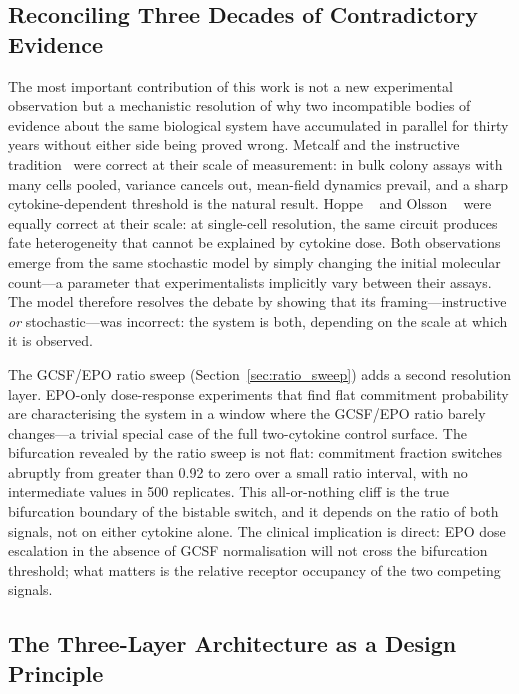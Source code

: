 
\subsection{Reconciling Three Decades of Contradictory Evidence}

The most important contribution of this work is not a new experimental
observation but a mechanistic resolution of why two incompatible bodies of
evidence about the same biological system have accumulated in parallel for thirty
years without either side being proved wrong. Metcalf and the instructive
tradition~\cite{metcalf1988} were correct at their scale of measurement: in bulk
colony assays with many cells pooled, variance cancels out, mean-field dynamics
prevail, and a sharp cytokine-dependent threshold is the natural result. Hoppe
\etal~\cite{hoppe2016} and Olsson \etal~\cite{olsson2016} were equally correct at
their scale: at single-cell resolution, the same circuit produces fate
heterogeneity that cannot be explained by cytokine dose. Both observations emerge
from the same stochastic model by simply changing the initial molecular
count---a parameter that experimentalists implicitly vary between their assays.
The model therefore resolves the debate by showing that its framing---instructive
\emph{or} stochastic---was incorrect: the system is both, depending on the scale
at which it is observed.

The GCSF/EPO ratio sweep (Section~\ref{sec:ratio_sweep}) adds a second resolution
layer. EPO-only dose-response experiments that find flat commitment probability
are characterising the system in a window where the GCSF/EPO ratio barely
changes---a trivial special case of the full two-cytokine control surface. The
bifurcation revealed by the ratio sweep is not flat: commitment fraction switches
abruptly from greater than 0.92 to zero over a small ratio interval, with no
intermediate values in 500 replicates. This all-or-nothing cliff is the true
bifurcation boundary of the bistable switch, and it depends on the ratio of both
signals, not on either cytokine alone. The clinical implication is direct: EPO
dose escalation in the absence of GCSF normalisation will not cross the
bifurcation threshold; what matters is the relative receptor occupancy of the two
competing signals.

\subsection{The Three-Layer Architecture as a Design Principle}

